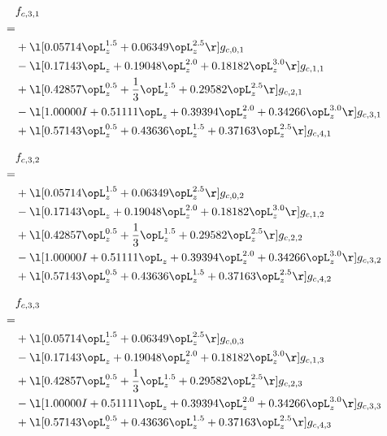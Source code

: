 \begin{alignat}{2} 
\label{eq:f_31_0} 
& f_{c,3,1} \nonumber \\ 
 = \\ 
& + \l[  0.05714 \opL_z^{1.5} +  0.06349 \opL_z^{2.5}  \r] g_{c,0,1} \nonumber \\ 
& - \l[  0.17143 \opL_z +  0.19048 \opL_z^{2.0} +  0.18182 \opL_z^{3.0}  \r] g_{c,1,1} \nonumber \\ 
& + \l[  0.42857 \opL_z^{0.5} + \frac{1}{3} \opL_z^{1.5} +  0.29582 \opL_z^{2.5}  \r] g_{c,2,1} \nonumber \\ 
& - \l[  1.00000 I +  0.51111 \opL_z +  0.39394 \opL_z^{2.0} +  0.34266 \opL_z^{3.0}  \r] g_{c,3,1} \nonumber \\ 
& + \l[  0.57143 \opL_z^{0.5} +  0.43636 \opL_z^{1.5} +  0.37163 \opL_z^{2.5}  \r] g_{c,4,1} \nonumber \\ 
\end{alignat} 


\begin{alignat}{2} 
\label{eq:f_32_0} 
& f_{c,3,2} \nonumber \\ 
 = \\ 
& + \l[  0.05714 \opL_z^{1.5} +  0.06349 \opL_z^{2.5}  \r] g_{c,0,2} \nonumber \\ 
& - \l[  0.17143 \opL_z +  0.19048 \opL_z^{2.0} +  0.18182 \opL_z^{3.0}  \r] g_{c,1,2} \nonumber \\ 
& + \l[  0.42857 \opL_z^{0.5} + \frac{1}{3} \opL_z^{1.5} +  0.29582 \opL_z^{2.5}  \r] g_{c,2,2} \nonumber \\ 
& - \l[  1.00000 I +  0.51111 \opL_z +  0.39394 \opL_z^{2.0} +  0.34266 \opL_z^{3.0}  \r] g_{c,3,2} \nonumber \\ 
& + \l[  0.57143 \opL_z^{0.5} +  0.43636 \opL_z^{1.5} +  0.37163 \opL_z^{2.5}  \r] g_{c,4,2} \nonumber \\ 
\end{alignat} 


\begin{alignat}{2} 
\label{eq:f_33_0} 
& f_{c,3,3} \nonumber \\ 
 = \\ 
& + \l[  0.05714 \opL_z^{1.5} +  0.06349 \opL_z^{2.5}  \r] g_{c,0,3} \nonumber \\ 
& - \l[  0.17143 \opL_z +  0.19048 \opL_z^{2.0} +  0.18182 \opL_z^{3.0}  \r] g_{c,1,3} \nonumber \\ 
& + \l[  0.42857 \opL_z^{0.5} + \frac{1}{3} \opL_z^{1.5} +  0.29582 \opL_z^{2.5}  \r] g_{c,2,3} \nonumber \\ 
& - \l[  1.00000 I +  0.51111 \opL_z +  0.39394 \opL_z^{2.0} +  0.34266 \opL_z^{3.0}  \r] g_{c,3,3} \nonumber \\ 
& + \l[  0.57143 \opL_z^{0.5} +  0.43636 \opL_z^{1.5} +  0.37163 \opL_z^{2.5}  \r] g_{c,4,3} \nonumber \\ 
\end{alignat} 


